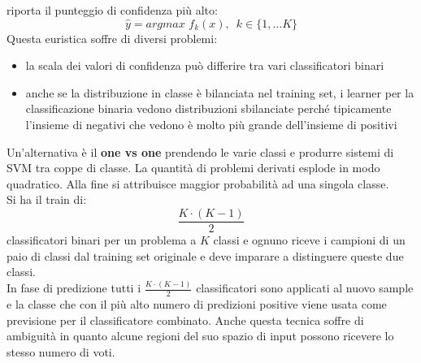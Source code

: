 \documentclass[a4paper,12pt, oneside]{book}
\begin{document}
riporta il punteggio di confidenza più alto:
\[\hat{y}=argmax\,\,f_k(x),\,\,\,k\in\{1,\ldots K\}\]
Questa euristica soffre di diversi problemi:
\begin{itemize}
  \item la scala dei valori di confidenza può differire tra vari classificatori
  binari 
  \item anche se la distribuzione in classe è bilanciata nel training set, i
  learner per la classificazione binaria vedono distribuzioni sbilanciate
  perché tipicamente l'insieme di negativi che vedono è molto più grande
  dell'insieme di positivi
\end{itemize}
Un'alternativa è il \textbf{one vs one} prendendo le varie classi e produrre
sistemi di SVM tra coppe di classe. La quantità di problemi derivati esplode in
modo quadratico. Alla fine si attribuisce maggior probabilità ad una singola
classe.\\
Si ha il train di:
\[\frac{K\cdot (K-1)}{2}\]
classificatori binari per un problema a $K$ classi e ognuno riceve i campioni di
un paio di classi dal training set originale e deve imparare a
distinguere queste due classi.\\
In fase di predizione tutti i $\frac{K\cdot (K-1)}{2}$ classificatori sono
applicati al nuovo sample e la classe che con il più alto numero di predizioni
positive viene usata come previsione per il classificatore combinato. Anche
questa tecnica soffre di ambiguità in quanto alcune regioni del suo spazio di
input possono ricevere lo stesso numero di voti.
\end{document}
